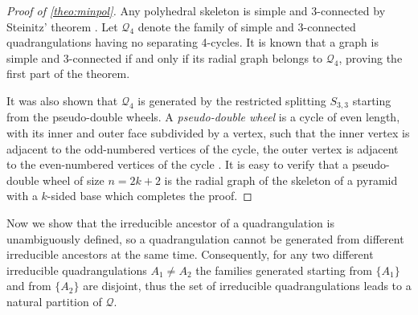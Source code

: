 \documentclass[]{article}
\begin{document}
\begin{proof}[Proof of \autoref*{theo:minpol}]
Any polyhedral skeleton is simple and 3-connected by Steinitz' theorem \cite{Mohar2001}.
Let $\mathscr{Q}_4$ denote the family of simple and 3-connected quadrangulations having no separating 4-cycles.
It is known \cite{Brinkmann2005} that a graph is simple and 3-connected if and only if its radial graph belongs to $\mathscr{Q}_4$, proving the first part of the theorem.

It was also shown \cite{Brinkmann2005} that $\mathscr{Q}_4$ is generated by the restricted splitting $S_{3,3}$ starting from the pseudo-double wheels.
A \emph{pseudo-double wheel} is a cycle of even length, with its inner and outer face subdivided by a vertex, such that the inner vertex is adjacent to the odd-numbered vertices of the cycle, the outer vertex is adjacent to the even-numbered vertices of the cycle \cite{Brinkmann2007}.
It is easy to verify that a pseudo-double wheel of size $n=2k+2$ is the radial graph of the skeleton of a pyramid with a $k$-sided base which completes the proof.
\end{proof}

Now we show that the irreducible ancestor of a quadrangulation is unambiguously defined, so a quadrangulation cannot be generated from different irreducible ancestors at the same time.
Consequently, for any two different irreducible quadrangulations $A_1\neq A_2$ the families generated starting from $\{A_1\}$ and from $\{A_2\}$ are disjoint, thus the set of irreducible quadrangulations leads to a natural partition of $\mathscr{Q}$.
\end{document}
